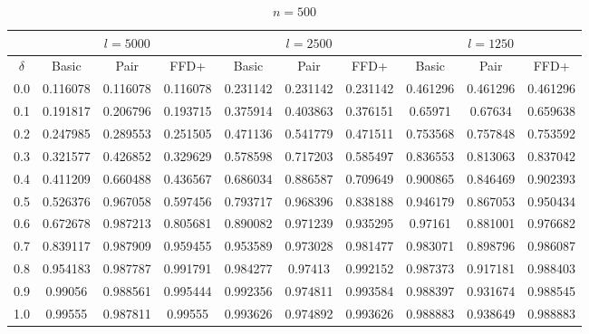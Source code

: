 \documentclass[oribibl]{llncs}
\begin{document}
\begin{table}[!htb]
	\centering
	\caption{$n = 500$}
	\begin{tabular}{c@{\hspace{15pt}}c@{\hspace{10pt}}c@{\hspace{10pt}}c@{\hspace{7pt}}| @{\hspace{7pt}}c@{\hspace{10pt}}c@{\hspace{10pt}}c@{\hspace{7pt}}| @{\hspace{7pt}} c@{\hspace{10pt}}c@{\hspace{10pt}}c}
		\noalign{\smallskip}
		& \multicolumn{3}{c}{$l = 5000$} & \multicolumn{3}{c}{$l = 2500$} & \multicolumn{3}{c}{$l = 1250$} \\
		\hline\noalign{\smallskip}
		$\delta$ & Basic & Pair & FFD+ & Basic & Pair & FFD+ & Basic & Pair & FFD+ \\
		\noalign{\smallskip}
		\hline
		\noalign{\smallskip}
		0.0 & 0.116078 & 0.116078 &	0.116078 & 0.231142 & 0.231142 & 0.231142 & 0.461296 & 0.461296 & 0.461296 \\
		0.1 & 0.191817 & 0.206796 &	0.193715 & 0.375914 & 0.403863 & 0.376151 & 0.65971 & 0.67634 & 0.659638 \\
		0.2	& 0.247985 & 0.289553 &	0.251505 & 0.471136 & 0.541779 & 0.471511 & 0.753568 & 0.757848 & 0.753592 \\
		0.3	& 0.321577 & 0.426852 &	0.329629 & 0.578598 & 0.717203 & 0.585497 & 0.836553 & 0.813063 & 0.837042 \\
		0.4	& 0.411209 & 0.660488 &	0.436567 & 0.686034 & 0.886587 & 0.709649 & 0.900865 & 0.846469 & 0.902393 \\
		0.5	& 0.526376 & 0.967058 &	0.597456 & 0.793717 & 0.968396 & 0.838188 & 0.946179 & 0.867053 & 0.950434 \\
		0.6	& 0.672678 & 0.987213 &	0.805681 & 0.890082 & 0.971239 & 0.935295 & 0.97161 & 0.881001 & 0.976682 \\
		0.7	& 0.839117 & 0.987909 &	0.959455 & 0.953589 & 0.973028 & 0.981477 & 0.983071 & 0.898796 & 0.986087 \\
		0.8	& 0.954183 & 0.987787 &	0.991791 & 0.984277 & 0.97413 & 0.992152 & 0.987373 & 0.917181 & 0.988403 \\
		0.9	& 0.99056 &	0.988561 & 0.995444 & 0.992356 & 0.974811 & 0.993584 & 0.988397 & 0.931674 & 0.988545 \\
		1.0	& 0.99555 &	0.987811 & 0.99555 & 0.993626 & 0.974892 & 0.993626 & 0.988883 & 0.938649 & 0.988883 \\
		\hline
	\end{tabular}
	\label{table:n500}
\end{table}	
\end{document}
